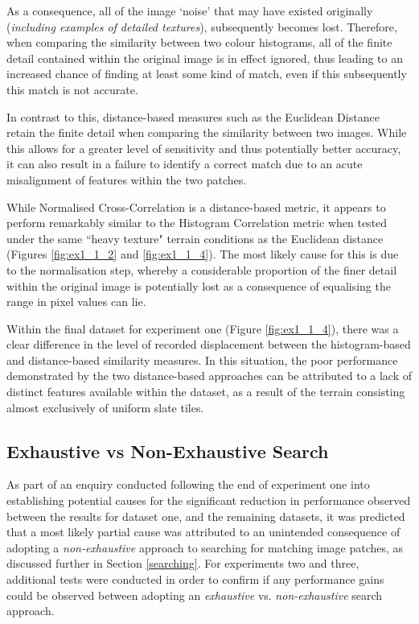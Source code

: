 As a consequence, all of the image `noise' that may have existed originally (\textit{including examples of detailed textures}), subsequently becomes lost. Therefore, when comparing the similarity between two colour histograms, all of the finite detail contained within the original image is in effect ignored, thus leading to an increased chance of finding at least some kind of match, even if this subsequently this match is not accurate. 

In contrast to this, distance-based measures such as the Euclidean Distance retain the finite detail when comparing the similarity between two images. While this allows for a greater level of sensitivity and thus potentially better accuracy, it can also result in a failure to identify a correct match due to an acute misalignment of features within the two patches.

While Normalised Cross-Correlation is a distance-based metric, it appears to perform remarkably similar to the Histogram Correlation metric when tested under the same ``heavy texture" terrain conditions as the Euclidean distance (Figures \ref{fig:ex1_1_2} and \ref{fig:ex1_1_4}). The most likely cause for this is due to the normalisation step, whereby a considerable proportion of the finer detail within the original image is potentially lost as a consequence of equalising the range in pixel values can lie. 

Within the final dataset for experiment one (Figure \ref{fig:ex1_1_4}), there was a clear difference in the level of recorded displacement between the histogram-based and distance-based similarity measures. In this situation, the poor performance demonstrated by the two distance-based approaches can be attributed to a lack of distinct features available within the dataset, as a result of the terrain consisting almost exclusively of uniform slate tiles.

\subsection{Exhaustive vs Non-Exhaustive Search}

As part of an enquiry conducted following the end of experiment one into establishing potential causes for the significant reduction in performance observed between the results for dataset one, and the remaining datasets, it was predicted that a most likely partial cause was attributed to an unintended consequence of adopting a \textit{non-exhaustive} approach to searching for matching image patches, as discussed further in Section \ref{searching}. For experiments two and three, additional tests were conducted in order to confirm if any performance gains could be observed between adopting an \textit{exhaustive} vs. \textit{non-exhaustive} search approach. 

